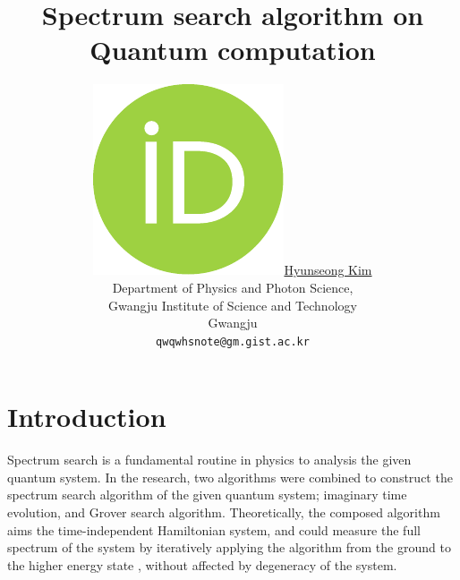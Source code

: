 \documentclass[twocolumn]{article}
\title{Spectrum search algorithm on Quantum computation
}
\author{
    \href{https://orcid.org/0000-0002-4876-7820}{
        \includegraphics[scale=0.06]{orcid.pdf}\hspace{1mm}Hyunseong Kim}\\
  Department of Physics and Photon Science,  \\
  Gwangju Institute of Science and Technology\\
  Gwangju\\
  \texttt{qwqwhsnote@gm.gist.ac.kr} \\
}
\begin{document}

    

\section{Introduction}
Spectrum search is a fundamental routine in physics to analysis 
the given quantum system. 
In the research, two algorithms were combined 
to construct the spectrum search algorithm of the given quantum system;
imaginary time evolution, and Grover search algorithm.
Theoretically, the composed algorithm aims the time-independent
Hamiltonian system, and could measure the full spectrum of the system
by iteratively applying the algorithm from the ground to the higher energy state
, without affected by degeneracy of the system.
\end{document}
